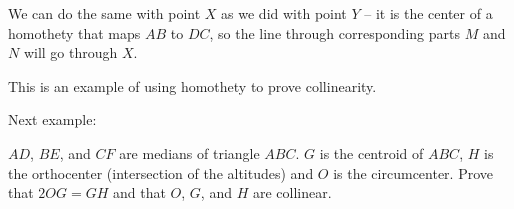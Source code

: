 










We can do the same with point $X$ as we did with point $Y$ -- it is the center of a homothety that maps $AB$ to $DC$, so the line through corresponding parts $M$ and $N$ will go through $X$.

This is an example of using homothety to prove collinearity.

Next example:

$AD$, $BE$, and $CF$ are medians of triangle $ABC$. $G$ is the centroid of $ABC$, $H$ is the orthocenter (intersection of the altitudes) and $O$ is the circumcenter. Prove that $2OG = GH$ and that $O$, $G$, and $H$ are collinear.

